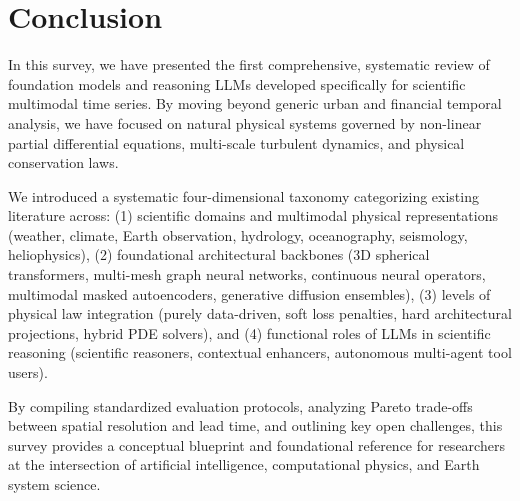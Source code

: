 \section{Conclusion}
\label{sec:conclusion}

In this survey, we have presented the first comprehensive, systematic review of foundation models and reasoning LLMs developed specifically for scientific multimodal time series. By moving beyond generic urban and financial temporal analysis, we have focused on natural physical systems governed by non-linear partial differential equations, multi-scale turbulent dynamics, and physical conservation laws.

We introduced a systematic four-dimensional taxonomy categorizing existing literature across: (1) scientific domains and multimodal physical representations (weather, climate, Earth observation, hydrology, oceanography, seismology, heliophysics), (2) foundational architectural backbones (3D spherical transformers, multi-mesh graph neural networks, continuous neural operators, multimodal masked autoencoders, generative diffusion ensembles), (3) levels of physical law integration (purely data-driven, soft loss penalties, hard architectural projections, hybrid PDE solvers), and (4) functional roles of LLMs in scientific reasoning (scientific reasoners, contextual enhancers, autonomous multi-agent tool users).

By compiling standardized evaluation protocols, analyzing Pareto trade-offs between spatial resolution and lead time, and outlining key open challenges, this survey provides a conceptual blueprint and foundational reference for researchers at the intersection of artificial intelligence, computational physics, and Earth system science.
